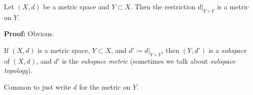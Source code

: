 \documentclass[10pt,aspectratio=149]{beamer}
\begin{document}
%
%
%

\begin{frame}

\begin{proposition}
Let $(X,d)$ be a metric space and $Y \subset X$.  Then the restriction
$d|_{Y \times Y}$ is a metric on $Y$.
\end{proposition}

\pause

\textbf{Proof:} Obvious.

\bigskip

\pause
\begin{definition}
If $(X,d)$ is a metric space, $Y \subset X$, and $d' \coloneqq d|_{Y \times Y}$,
then $(Y,d')$ is a \emph{subspace} of $(X,d)$, and
$d'$ is the \emph{subspace metric} (sometimes we talk about
\emph{subspace topology}).
\end{definition}

\pause
Common to just write $d$ for the metric on $Y$.

\end{frame}
\end{document}

